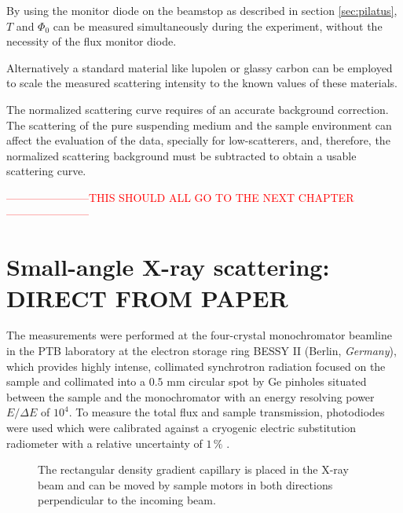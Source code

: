 By using the monitor diode on the beamstop as described in section \ref{sec:pilatus}, $T$ and $\Phi_0$ can be measured simultaneously during the experiment, without the necessity of the flux monitor diode.

Alternatively a standard material like lupolen \cite{kratky_absolute_1966,shaffer_calibration_1974} or glassy carbon \cite{perret_glassy_1972} can be employed to scale the measured scattering intensity to the known values of these materials.

The normalized scattering curve requires of an accurate background correction. The scattering of the pure suspending medium and the sample environment can affect the evaluation of the data, specially for low-scatterers, and, therefore, the normalized scattering background must be subtracted to obtain a usable scattering curve.








\textcolor{red}{-----------------------THIS SHOULD ALL GO TO THE NEXT CHAPTER-----------------------}











\section{Small-angle X-ray scattering: DIRECT FROM PAPER}
The measurements were performed at the four-crystal monochromator beamline in the PTB laboratory at the electron storage ring BESSY II (Berlin, \emph{Germany}), which provides highly intense, collimated synchrotron radiation focused on the sample and collimated into a \(0.5\) mm circular spot by Ge pinholes situated between the sample and the monochromator with an energy resolving power \( E/\Delta E \) of \( 10^4 \). To measure the total flux and sample transmission, photodiodes were used which were calibrated against a cryogenic electric substitution radiometer with a relative uncertainty of \( 1\,\% \) \cite{krumrey_high-accuracy_2001}.


\begin{figure}%
	\centering
		
		\caption{The rectangular density gradient capillary is placed in the X-ray beam and can be moved by sample motors in both directions perpendicular to the incoming beam.}
		\label{fig:DensityGradientCapillarySetup}
\end{figure}

